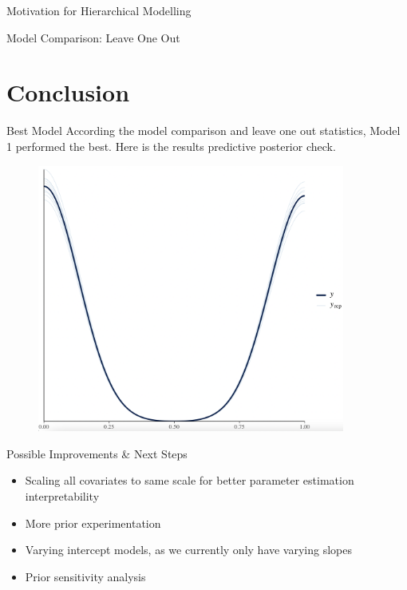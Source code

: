 \documentclass{beamer}
\begin{document}
\begin{frame}{Motivation for Hierarchical Modelling}
\begin{frame}{Model Comparison: Leave One Out}
\begin{table}[!htbp]
        \caption{Model comparison with LOO statistics, Moment Matching} 
        
      
      \end{table}

\end{frame}




\section{Conclusion}

\begin{frame}{Best Model}
    According the model comparison and leave one out statistics, Model 1 performed the best. Here is the results predictive posterior check.
    \begin{figure}
        \includegraphics[width=0.9\textwidth]{plots/model1_posteriortheta.png}
    \end{figure} 
\end{frame}



\begin{frame}{Possible Improvements & Next Steps}
    \begin{itemize}
        \item Scaling all covariates to same scale for better parameter estimation interpretability
        \item More prior experimentation 
        \item Varying intercept models, as we currently only have varying slopes
        \item Prior sensitivity analysis     
    \end{itemize}
\end{frame}









\end{frame}
\end{document}
